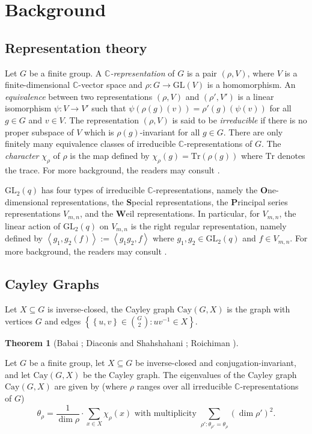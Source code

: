 \documentclass[12pt, reqno]{amsart}
\theoremstyle{definition}
\newtheorem{theorem}{Theorem}[section]
\theoremstyle{remark}
\numberwithin{equation}{section}
\newcommand{\BC}{\mathbb{C}}
\newcommand{\cb}[1]{\left\{#1\right\}}
\newcommand{\jk}[1]{\left\langle#1\right\rangle}
\newcommand{\GL}{\mathrm{GL}}
\newcommand{\Cay}{\mathrm{Cay}}
\begin{document}
\newpage
\section{Background}\label{Background}

\subsection{Representation theory}\label{representation_theory}

Let $G$ be a finite group. A \emph{$\BC$-representation} of $G$ is a pair $(\rho, V)$, where $V$ is a finite-dimensional $\BC$-vector space and $\rho: G \rightarrow \GL(V)$ is a homomorphism. An \emph{equivalence} between two representations $(\rho, V)$ and $(\rho', V')$ is a linear isomorphism $\psi: V \rightarrow V'$ such that $\psi(\rho(g)(v)) = \rho'(g)(\psi(v))$ for all $g \in G$ and $v \in V$. The representation $(\rho, V)$ is said to be \emph{irreducible} if there is no proper subspace of $V$ which is $\rho(g)$-invariant for all $g \in G$. There are only finitely many equivalence classes of irreducible $\BC$-representations of $G$. The \emph{character} $\chi_\rho$ of $\rho$ is the map defined by $\chi_\rho(g) = \mathrm{Tr}(\rho(g))$ where $\mathrm{Tr}$ denotes the trace. For more background, the readers may consult \cite{MR1878556, MR1824028, MR450380}.

$\GL_2(q)$ has four types of irreducible $\BC$-representations, namely the \textbf{O}ne-dimensional representations, the \textbf{S}pecial representations, the \textbf{P}rincipal series representations $V_{m, n}$, and the \textbf{W}eil representations. In particular, for $V_{m, n}$, the linear action of $\GL_2(q)$ on $V_{m, n}$ is the right regular representation, namely defined by $\jk{g_1, g_2(f)} := \jk{g_1g_2, f}$ where $g_1, g_2 \in \GL_2(q)$ and $f \in V_{m, n}$. For more background, the readers may consult \cite{MR1431508}.

\subsection{Cayley Graphs}

Let $X \subseteq G$ is inverse-closed, the Cayley graph $\Cay(G, X)$ is the graph with vertices $G$ and edges $\cb{\cb{u, v} \in \binom{G}{2}: uv^{-1} \in X}$.

\begin{theorem}[Babai \cite{MR546860}; Diaconis and Shahshahani \cite{MR626813}; Roichiman \cite{MR1400314}]\label{babai}
	
	Let $G$ be a finite group, let $X \subseteq G$ be inverse-closed and conjugation-invariant, and let $\Cay(G, X)$ be the Cayley graph. The eigenvalues of the Cayley graph $\Cay(G, X)$ are given by (where $\rho$ ranges over all irreducible $\BC$-representations of $G$)
	\[\theta_\rho = \frac{1}{\dim\rho}\cdot\sum_{x \in X}\chi_\rho(x) \text{ with multiplicity } \sum\limits_{\rho': \theta_{\rho'} = \theta_\rho}(\dim\rho')^2.\]
	
	
\end{theorem}
\end{document}
